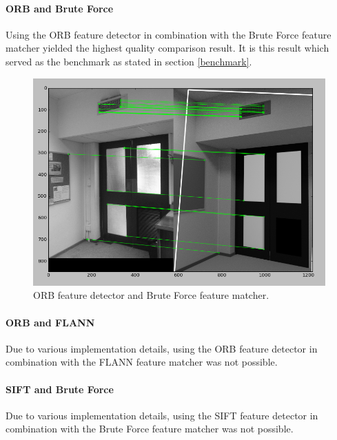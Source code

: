 \documentclass[11pt,a4paper]{report}
\begin{document}
				\paragraph{ORB and Brute Force}
					Using the ORB feature detector in combination with the Brute Force feature matcher yielded the highest quality comparison result. It is this result which served as the benchmark as stated in section \ref{benchmark}.
					\begin{figure}[H]
						\centering
						\includegraphics[width=1\textwidth]{best_comparason}
						\caption{ORB feature detector and Brute Force feature matcher.}
						\label{fig:orb_and_brute_force}
					\end{figure}
					
				\paragraph{ORB and FLANN}
					Due to various implementation details, using the ORB feature detector in combination with the FLANN feature matcher was not possible.
				
				\paragraph{SIFT and Brute Force}
					Due to various implementation details, using the SIFT feature detector in combination with the Brute Force feature matcher was not possible.
				
\end{document}
